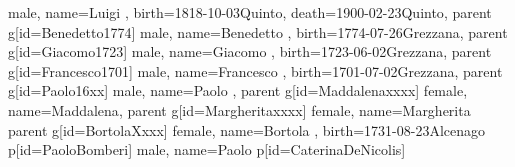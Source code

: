 \documentclass{article}
\begin{document}
\begin{midpage}
\begin{center}
\begin{genealogypicture}
{{{{{{{                            male,
                            name={Luigi },
                            birth={1818-10-03}{Quinto},
                            death={1900-02-23}{Quinto},
                        }
                        parent{
                            g[id=Benedetto1774]{
                                male,
                                name={Benedetto },
                                birth={1774-07-26}{Grezzana},
                            }
                            parent{
                                g[id=Giacomo1723]{
                                    male,
                                    name={Giacomo },
                                    birth={1723-06-02}{Grezzana},
                                }
                                parent{
                                    g[id=Francesco1701]{
                                        male,
                                        name={Francesco },
                                        birth={1701-07-02}{Grezzana},
                                    }
                                    parent{
                                        g[id=Paolo16xx]{
                                            male,
                                            name={Paolo },
                                        }
                                    }
                                    parent{
                                        g[id=Maddalenaxxxx]{
                                            female,
                                            name={Maddalena},
                                        }
                                    }
                                }
                                parent{
                                    g[id=Margheritaxxxx]{
                                        female,
                                        name={Margherita }
                                    }
                                }
                            }
                            parent{
                                g[id=BortolaXxxx]{
                                    female,
                                    name={Bortola },
                                    birth={1731-08-23}{Alcenago}
                                }
                                p[id=PaoloBomberi]{
                                    male,
                                    name={Paolo }
                                }
                                p[id=CaterinaDeNicolis] {
}}}}}}}}}
\end{genealogypicture}
\end{center}
\end{midpage}
\end{document}
